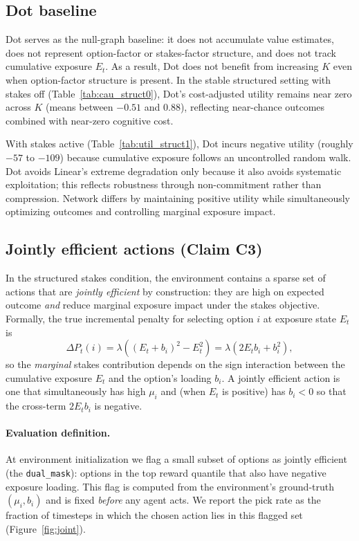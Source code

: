 \documentclass[11pt]{article}
\begin{document}
\subsection{Dot baseline}

Dot serves as the null-graph baseline: it does not accumulate value estimates, does not represent option-factor or stakes-factor structure, and does not track cumulative exposure $E_t$. As a result, Dot does not benefit from increasing $K$ even when option-factor structure is present. In the stable structured setting with stakes off (Table~\ref{tab:cau_struct0}), Dot's cost-adjusted utility remains near zero across $K$ (means between $-0.51$ and $0.88$), reflecting near-chance outcomes combined with near-zero cognitive cost.

With stakes active (Table~\ref{tab:util_struct1}), Dot incurs negative utility (roughly $-57$ to $-109$) because cumulative exposure follows an uncontrolled random walk. Dot avoids Linear's extreme degradation only because it also avoids systematic exploitation; this reflects robustness through non-commitment rather than compression. Network differs by maintaining positive utility while simultaneously optimizing outcomes and controlling marginal exposure impact.


\subsection{Jointly efficient actions (Claim C3)}

In the structured stakes condition, the environment contains a sparse set of actions that are \emph{jointly efficient} by construction: they are high on expected outcome \emph{and} reduce marginal exposure impact under the stakes objective.
Formally, the true incremental penalty for selecting option $i$ at exposure state $E_t$ is
\[
\Delta P_t(i)=\lambda\left((E_t+b_i)^2-E_t^2\right)=\lambda(2E_tb_i+b_i^2),
\]
so the \emph{marginal} stakes contribution depends on the sign interaction between the cumulative exposure $E_t$ and the option's loading $b_i$.
A jointly efficient action is one that simultaneously has high $\mu_i$ and (when $E_t$ is positive) has $b_i<0$ so that the cross-term $2E_tb_i$ is negative.

\paragraph{Evaluation definition.}
At environment initialization we flag a small subset of options as jointly efficient (the \texttt{dual\_mask}): options in the top reward quantile that also have negative exposure loading.
This flag is computed from the environment's ground-truth $(\mu_i,b_i)$ and is fixed \emph{before} any agent acts.
We report the pick rate as the fraction of timesteps in which the chosen action lies in this flagged set (Figure~\ref{fig:joint}).
\end{document}

